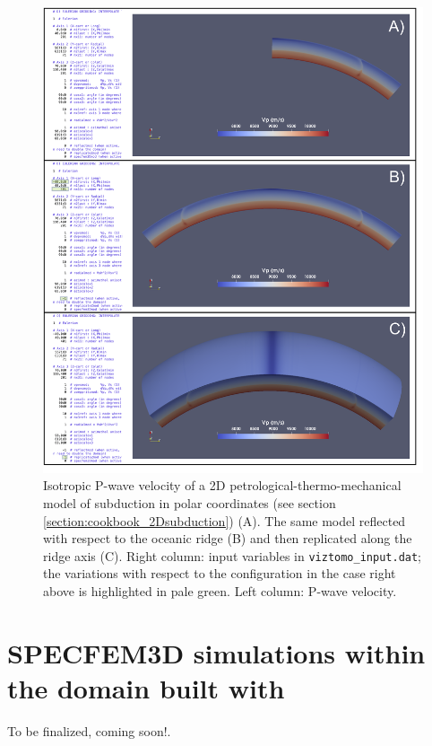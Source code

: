 \begin{figure}[ht]
    \centering
    \includegraphics[width=1.0\textwidth]{VIZTOMO/reflectreplicate.png}
    \caption{Isotropic P-wave velocity of a 2D petrological-thermo-mechanical model of subduction in polar coordinates (see section \ref{section:cookbook_2Dsubduction}) (A). The same model reflected with respect to the oceanic ridge (B) and then replicated along the ridge axis (C). Right column: input variables in \texttt{viztomo\_input.dat}; the variations with respect to the configuration in the case right above is highlighted in pale green. Left column: P-wave velocity.  
    }
    \label{fig:reflectreplicate}
\end{figure}





\section{SPECFEM3D simulations within the domain built with \viztomotitle{}}

To be finalized, coming soon!.\\

\vfill %